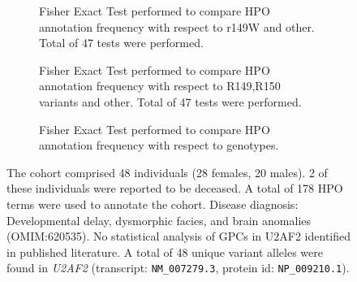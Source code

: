 \begin{figure}[htbp]
\begin{subfigure}[b]{0.95\textwidth}
\centering
{}
\captionsetup{justification=raggedright,singlelinecheck=false}
\caption{Fisher Exact Test performed to compare HPO annotation frequency with respect to r149W and other. Total of 47 tests were performed.}
\end{subfigure}
\vspace{2em}
\begin{subfigure}[b]{0.95\textwidth}
\centering
{}
\captionsetup{justification=raggedright,singlelinecheck=false}
\caption{Fisher Exact Test performed to compare HPO annotation frequency with respect to R149,R150 variants and other. Total of
        47 tests were performed.}
\end{subfigure}
\vspace{2em}
\begin{subfigure}[b]{0.95\textwidth}
\centering
{}
\captionsetup{justification=raggedright,singlelinecheck=false}
\caption{Fisher Exact Test performed to compare HPO annotation frequency with respect to genotypes. }
\end{subfigure}

\vspace{2em}

\caption{ The cohort comprised 48 individuals (28 females, 20 males). 2 of these individuals were reported to be deceased. A total of 178 HPO terms were used to annotate the cohort. Disease diagnosis: Developmental delay, dysmorphic facies, and brain anomalies (OMIM:620535). No statistical analysis of GPCs in U2AF2 identified in published literature. A total of 48 unique variant alleles were found in \textit{U2AF2} (transcript: \texttt{NM\_007279.3}, protein id: \texttt{NP\_009210.1}).}
\end{figure}
